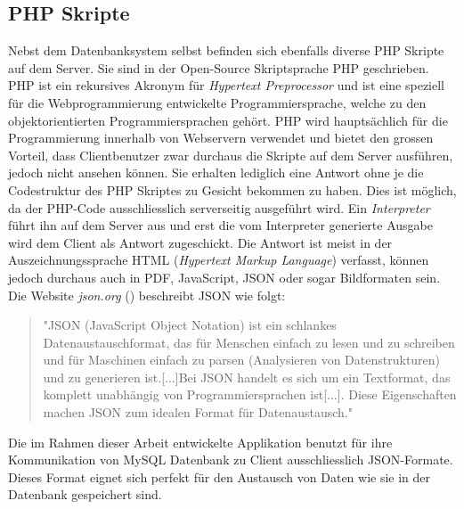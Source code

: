 \documentclass[a4paper,11pt]{report}
\begin{document}
				\subsection{PHP Skripte} \label{ssec:PHP}
				Nebst dem Datenbanksystem selbst befinden sich ebenfalls diverse PHP Skripte auf dem Server. Sie sind in der Open-Source Skriptsprache PHP geschrieben. PHP ist ein rekursives Akronym für \emph{Hypertext Preprocessor} und ist eine speziell für die Webprogrammierung entwickelte Programmiersprache, welche zu den objektorientierten Programmiersprachen gehört. PHP wird hauptsächlich für die Programmierung innerhalb von Webservern verwendet und bietet den grossen Vorteil, dass Clientbenutzer zwar durchaus die Skripte auf dem Server ausführen, jedoch nicht ansehen können. Sie erhalten lediglich eine Antwort ohne je die Codestruktur des PHP Skriptes zu Gesicht bekommen zu haben.\cite{PHP} Dies ist möglich, da der PHP-Code ausschliesslich serverseitig ausgeführt wird. Ein \emph{Interpreter} führt ihn auf dem Server aus und erst die vom Interpreter generierte Ausgabe wird dem Client als Antwort zugeschickt. Die Antwort ist meist in der Auszeichnungssprache HTML (\emph{Hypertext Markup Language}) verfasst, können jedoch durchaus auch in PDF, JavaScript, JSON oder sogar Bildformaten sein.\cite{PHP:function} Die Website \emph{json.org} (\cite{JSON}) beschreibt JSON wie folgt:
				
				\begin{quotation}
					"JSON (JavaScript Object Notation) ist ein schlankes Datenaustauschformat, das für Menschen einfach zu lesen und zu schreiben und für Maschinen einfach zu parsen (Analysieren von Datenstrukturen) und zu generieren ist.[...]Bei JSON handelt es sich um ein Textformat, das komplett unabhängig von Programmiersprachen ist[...]. Diese Eigenschaften machen JSON zum idealen Format für Datenaustausch."\cite{JSON}
				\end{quotation}
			
				Die im Rahmen dieser Arbeit entwickelte Applikation benutzt für ihre Kommunikation von MySQL Datenbank zu Client ausschliesslich JSON-Formate. Dieses Format eignet sich perfekt für den Austausch von Daten wie sie in der Datenbank gespeichert sind.
				
\end{document}
